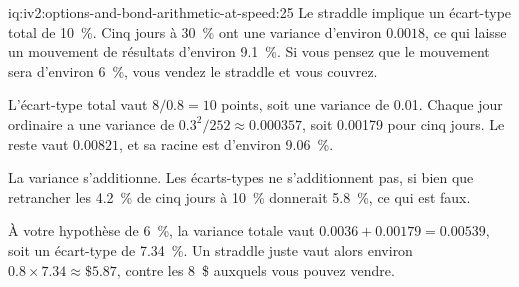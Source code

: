 \begin{solution}{iq:iv2:options-and-bond-arithmetic-at-speed:25}
Le straddle implique un écart-type total de 10~\%. Cinq jours à 30~\% ont une variance d'environ $0.0018$, ce qui laisse un mouvement de résultats d'environ 9.1~\%. Si vous pensez que le mouvement sera d'environ 6~\%, vous vendez le straddle et vous couvrez.

L'écart-type total vaut $8/0.8 = 10$ points, soit une variance de 0.01. Chaque jour ordinaire a une variance de $0.3^2/252 \approx 0.000357$, soit 0.00179 pour cinq jours. Le reste vaut $0.00821$, et sa racine est d'environ 9.06~\%.

La variance s'additionne. Les écarts-types ne s'additionnent pas, si bien que retrancher les 4.2~\% de cinq jours à 10~\% donnerait 5.8~\%, ce qui est faux.

À votre hypothèse de 6~\%, la variance totale vaut $0.0036 + 0.00179 = 0.00539$, soit un écart-type de 7.34~\%. Un straddle juste vaut alors environ $0.8 \times 7.34 \approx \$5.87$, contre les 8~\$ auxquels vous pouvez vendre.

\end{solution}
